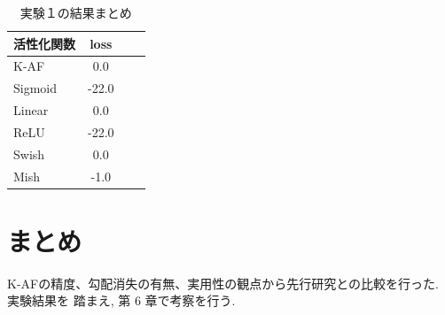 \begin{table}[htbp]
    \begin{center}
        \caption{実験１の結果まとめ}
        \vspace{5mm} 
        \begin{tabular}{l*{2}{c}r}
            活性化関数              & loss \\
            \hline
            K-AF            & 0.0 \\
            Sigmoid            & -22.0 \\
            Linear            & 0.0 \\
            ReLU        & -22.0 \\
            Swish           & 0.0 \\
            Mish           & -1.0 \\
    
        \end{tabular}
    \end{center}
\end{table}




\section{まとめ}

K-AFの精度、勾配消失の有無、実用性の観点から先行研究との比較を行った. 実験結果を
踏まえ, 第 6 章で考察を行う.


